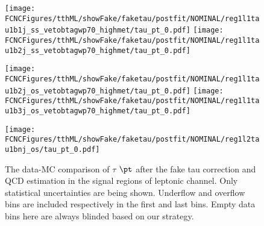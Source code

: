 \begin{figure}[H]
\centering
\texttt{[image: \\FCNCFigures/tthML/showFake/faketau/postfit/NOMINAL/reg1l1tau1b1j\_ss\_vetobtagwp70\_highmet/tau\_pt\_0.pdf]}
\texttt{[image: \\FCNCFigures/tthML/showFake/faketau/postfit/NOMINAL/reg1l1tau1b2j\_ss\_vetobtagwp70\_highmet/tau\_pt\_0.pdf]}

\texttt{[image: \\FCNCFigures/tthML/showFake/faketau/postfit/NOMINAL/reg1l1tau1b2j\_os\_vetobtagwp70\_highmet/tau\_pt\_0.pdf]}
\texttt{[image: \\FCNCFigures/tthML/showFake/faketau/postfit/NOMINAL/reg1l1tau1b3j\_os\_vetobtagwp70\_highmet/tau\_pt\_0.pdf]}

\texttt{[image: \\FCNCFigures/tthML/showFake/faketau/postfit/NOMINAL/reg1l2tau1bnj\_os/tau\_pt\_0.pdf]}
\caption{ The data-MC comparison of $\tau$ $\pt$ after the fake tau correction and QCD estimation  in the signal regions of leptonic channel. Only statistical uncertainties are being shown. Underflow and overflow bins are included respectively in the first and last bins. Empty data bins here are always blinded based on our strategy.}
\label{fig:wjet_pt_postfit}
\end{figure}
